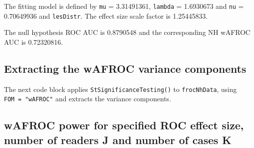 \documentclass[
]{book}
\newenvironment{Shaded}{\begin{snugshade}}{\end{snugshade}}
\newcommand{\AttributeTok}[1]{\textcolor[rgb]{0.77,0.63,0.00}{#1}}
\newcommand{\FunctionTok}[1]{\textcolor[rgb]{0.00,0.00,0.00}{#1}}
\newcommand{\NormalTok}[1]{#1}
\newcommand{\OtherTok}[1]{\textcolor[rgb]{0.56,0.35,0.01}{#1}}
\newcommand{\SpecialCharTok}[1]{\textcolor[rgb]{0.00,0.00,0.00}{#1}}
\newcommand{\StringTok}[1]{\textcolor[rgb]{0.31,0.60,0.02}{#1}}
\begin{document}
The fitting model is defined by \texttt{mu} = 3.31491361, \texttt{lambda} = 1.6930673 and \texttt{nu} = 0.70649936 and \texttt{lesDistr}. The effect size scale factor is 1.25445833.

\begin{Shaded}
\end{Shaded}

The null hypothesis ROC AUC is 0.8790548 and the corresponding NH wAFROC AUC is 0.72320816.

\hypertarget{extracting-the-wafroc-variance-components}{%
\subsection{Extracting the wAFROC variance components}\label{extracting-the-wafroc-variance-components}}

The next code block applies \texttt{StSignificanceTesting()} to \texttt{frocNhData}, using \texttt{FOM\ =\ "wAFROC"} and extracts the variance components.

\begin{Shaded}
\end{Shaded}

\hypertarget{wafroc-power-for-specified-roc-effect-size-number-of-readers-j-and-number-of-cases-k}{%
\subsection{wAFROC power for specified ROC effect size, number of readers J and number of cases K}\label{wafroc-power-for-specified-roc-effect-size-number-of-readers-j-and-number-of-cases-k}}
\end{document}
